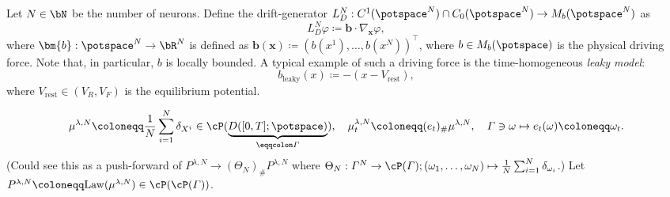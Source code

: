 Let $N \in \bN$ be the number of neurons.
Define the drift-generator $L_D^{N} : C^1(\potspace^N) \cap C_0(\potspace^N) \to M_b(\potspace^N)$ as
\begin{equation}
  L_D^{N}\varphi \coloneqq \bm{b} \cdot \nabla_{\bm{x}} \varphi,
\end{equation}
where $\bm{b} : \potspace^N \to \bR^N$ is defined as $\bm{b}(\bm{x}) \coloneqq (b(x^1), \dots, b(x^N))^\top$, where $b \in M_b(\potspace)$ is the physical driving force.
Note that, in particular, $b$ is locally bounded.
\newline
A typical example of such a driving force is the time-homogeneous \textit{leaky model}:
\begin{equation}
  b_{\mathrm{leaky}}(x) \coloneqq -(x - V_\mathrm{rest}),
\end{equation}
where $V_\mathrm{rest} \in (V_R, V_F)$ is the equilibrium potential.



\begin{equation}
  \mu^{\lambda, N} \coloneqq \frac{1}{N} \sum_{i=1}^N \delta_{X^i} \in \cP(\underbrace{D([0,T]; \potspace)}_{\eqqcolon \varGamma}),
  \quad \mu_t^{\lambda, N} \coloneqq (e_t)_\# \mu^{\lambda, N},
  \quad \varGamma \ni \omega \mapsto e_t(\omega) \coloneqq \omega_t.
\end{equation}
(Could see this as a push-forward of $P^{\lambda, N} \to (\Theta_N)_\# P^{\lambda, N}$ where $\Theta_N : \varGamma^N \to \cP(\varGamma); (\omega_1,\dots,\omega_N) \mapsto \frac{1}{N} \sum_{i=1}^N \delta_{\omega_i}$.)
Let $P^{\lambda, N} \coloneqq \mathrm{Law}(\mu^{\lambda, N}) \in \cP(\cP(\varGamma))$.

